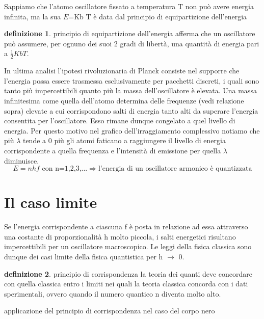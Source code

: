 \documentclass{article}
\theoremstyle{definition}
\newtheorem{defin}{definizione}[section]
\begin{document}
Sappiamo che l'atomo oscillatore fissato a temperatura T non può avere energia infinita, ma la sua \(\overline{E}\)=Kb T è data dal principio di equipartizione dell'energia
\begin{defin}{principio di equipartizione dell'energia}
afferma che un oscillatore può assumere, per ognuno dei suoi 2 gradi di libertà, una quantità di energia pari a \(\frac{1}{2}Kb T\).
\end{defin}

In ultima analisi l'ipotesi rivoluzionaria di Planck consiste nel supporre che l'energia possa essere trasmessa esclusivamente per pacchetti discreti, i quali sono tanto più impercettibili quanto più la massa dell'oscillatore è elevata.  Una massa infinitesima come quella dell'atomo determina delle frequenze (vedi relazione sopra) elevate a cui corrispondono salti di energia tanto alti da superare l'energia consentita per l'oscillatore. Esso rimane dunque congelato a quel livello di energia.
Per questo motivo nel grafico dell'irraggiamento complessivo notiamo che più \(\lambda\) tende a 0 più gli atomi faticano a raggiungere il livello di energia corrispondente a quella frequenza e l'intensità di emissione per quella \(\lambda\) diminuisce. 
\begin{equation}
    E=n h f \text{  con n=1,2,3,...}\Rightarrow \text{l'energia di un oscillatore armonico è quantizzata}
\end{equation}


\section*{Il caso limite}
Se l'energia corrispondente a ciascuna f è posta in relazione ad essa attraverso una costante di proporzionalità h molto piccola, i salti energetici risultano impercettibili per un oscillatore macroscopico. Le leggi della fisica classica sono dunque dei casi limite della fisica quantistica per h \(\rightarrow\) 0.
\begin{defin}{principio di corrispondenza}
la teoria dei quanti deve concordare con quella classica entro i limiti nei quali la teoria classica concorda con i dati sperimentali, ovvero quando il numero quantico n diventa molto alto.
\end{defin}
applicazione del principio di corrispondenza nel caso del corpo nero\\
\end{document}
